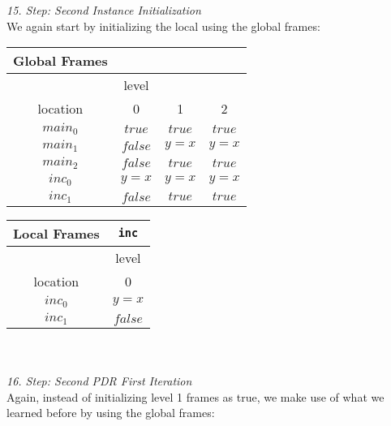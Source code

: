 \documentclass{article}
\begin{document}
	\textsl{15. Step: Second Instance Initialization} \\
	We again start by initializing the local using the global frames: \\
	\begin{minipage}{.4\textwidth}
		\setlength\tabcolsep{0.35em}
		\begin{center}
			\begin{tabu}{cccc}
				Global Frames \\
				\toprule
				& level \\
				\cmidrule(lr){2-2}
				location & 0 & 1 & 2 \\
				$main_0$ & $true$ & $true$ & $true$  \\
				$main_1$ & $false$ & $y = x$ & $y = x$\\
				$main_2$ & $false$ & $true$ & $true$ \\
				$inc_0$ & $y = x$ & $y = x$ & $y = x$ \\
				$inc_1$ & $false$ & $true$ & $true$\\
				\bottomrule
			\end{tabu}
		\end{center}
	\end{minipage}
	\hfill
	\begin{minipage}{.5\textwidth}
		\setlength\tabcolsep{0.35em}
		\begin{center}
			\begin{tabu}{cc}
				Local Frames & \texttt{inc}\\
				\toprule
				& level \\
				\cmidrule(lr){2-2}
				location & 0  \\
				\cmidrule{1-2}
				$inc_0$ & $y = x$  \\
				$inc_1$ & $false$ \\
				\bottomrule
			\end{tabu}
		\end{center}	
	\end{minipage} \\ \\

\textsl{16. Step: Second PDR First Iteration} \\
Again, instead of initializing level 1 frames as true, we make use of what we learned before by using the global frames: \\
\end{document}
